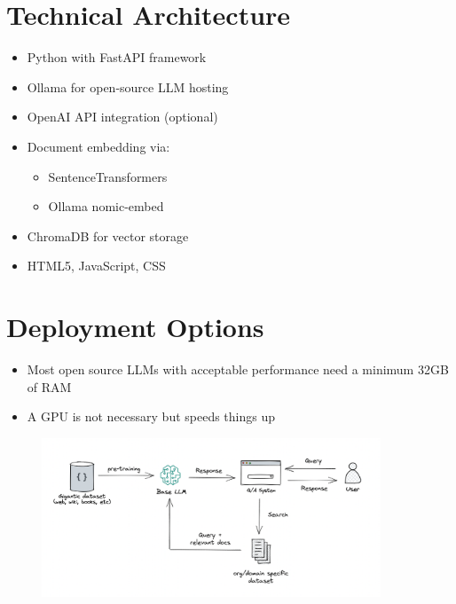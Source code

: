 \documentclass[a4paper,10pt]{article}
\begin{document}
\begin{multicols}{2}
\section{Technical Architecture}
\begin{itemize}
\item Python with FastAPI framework
\item Ollama for open-source LLM hosting
\item OpenAI API integration (optional)
\item Document embedding via:
  \begin{itemize}
  \item SentenceTransformers
  \item Ollama nomic-embed
  \end{itemize}
\item ChromaDB for vector storage
\item HTML5, JavaScript, CSS
\end{itemize}
\section{Deployment Options}
\begin{itemize}
\item Most open source LLMs with acceptable performance need a minimum 32GB of RAM
\item A GPU is not necessary but speeds things up
\end{itemize}
\end{multicols}

\begin{figure}[b]     %
    \centering
    \includegraphics[width=0.9\textwidth]{rag.png}
\end{figure}
\end{document}
